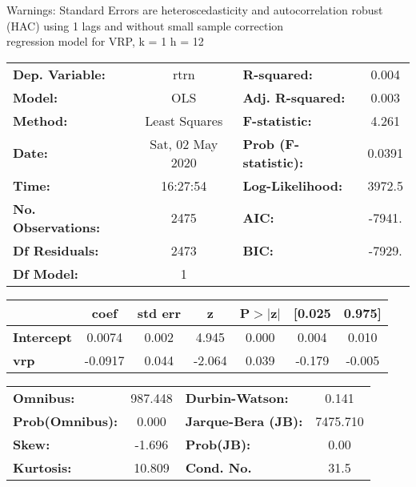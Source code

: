 Warnings: \newline
 [1] Standard Errors are heteroscedasticity and autocorrelation robust (HAC) using 1 lags and without small sample correction\\ 

regression model for VRP, k = 1 h = 12\begin{center}
\begin{tabular}{lclc}
\toprule
\textbf{Dep. Variable:}    &       rtrn       & \textbf{  R-squared:         } &     0.004   \\
\textbf{Model:}            &       OLS        & \textbf{  Adj. R-squared:    } &     0.003   \\
\textbf{Method:}           &  Least Squares   & \textbf{  F-statistic:       } &     4.261   \\
\textbf{Date:}             & Sat, 02 May 2020 & \textbf{  Prob (F-statistic):} &   0.0391    \\
\textbf{Time:}             &     16:27:54     & \textbf{  Log-Likelihood:    } &    3972.5   \\
\textbf{No. Observations:} &        2475      & \textbf{  AIC:               } &    -7941.   \\
\textbf{Df Residuals:}     &        2473      & \textbf{  BIC:               } &    -7929.   \\
\textbf{Df Model:}         &           1      & \textbf{                     } &             \\
\bottomrule
\end{tabular}
\begin{tabular}{lcccccc}
                   & \textbf{coef} & \textbf{std err} & \textbf{z} & \textbf{P$> |$z$|$} & \textbf{[0.025} & \textbf{0.975]}  \\
\midrule
\textbf{Intercept} &       0.0074  &        0.002     &     4.945  &         0.000        &        0.004    &        0.010     \\
\textbf{vrp}       &      -0.0917  &        0.044     &    -2.064  &         0.039        &       -0.179    &       -0.005     \\
\bottomrule
\end{tabular}
\begin{tabular}{lclc}
\textbf{Omnibus:}       & 987.448 & \textbf{  Durbin-Watson:     } &    0.141  \\
\textbf{Prob(Omnibus):} &   0.000 & \textbf{  Jarque-Bera (JB):  } & 7475.710  \\
\textbf{Skew:}          &  -1.696 & \textbf{  Prob(JB):          } &     0.00  \\
\textbf{Kurtosis:}      &  10.809 & \textbf{  Cond. No.          } &     31.5  \\
\bottomrule
\end{tabular}
\end{center}

